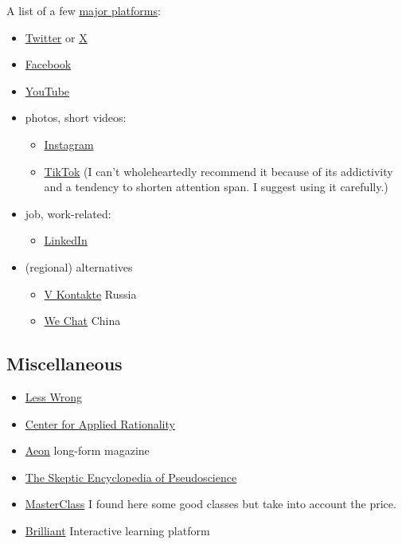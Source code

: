 \documentclass{article}
\begin{document}
A list of a few \href{https://www.visualcapitalist.com/ranked-social-networks-worldwide-by-users/}{major platforms}:
\begin{itemize}
    \item \href{https://twitter.com/?lang=en}{Twitter} or \href{https://x.com/}{X}
    \item \href{https://www.facebook.com/}{Facebook}
    \item \href{https://www.youtube.com/}{YouTube}
    \item photos, short videos:
    \begin{itemize}
        \item \href{https://www.instagram.com/?hl=en}{Instagram}
        \item \href{https://www.tiktok.com/en/}{TikTok} (I can't wholeheartedly recommend it because of its addictivity and a tendency to shorten attention span. I suggest using it carefully.)
    \end{itemize}
    \item job, work-related:
    \begin{itemize}
        \item \href{https://www.linkedin.com/}{LinkedIn}
    \end{itemize}
    \item (regional) alternatives
    \begin{itemize}
        \item \href{https://vk.com/?lang=en}{V Kontakte} Russia
        \item \href{https://www.wechat.com/}{We Chat} China
    \end{itemize}
\end{itemize}


\subsection{Miscellaneous}

\begin{itemize}
    \item \href{https://www.lesswrong.com/}{Less Wrong}
    \item \href{https://rationality.org/}{Center for Applied Rationality}
    \item \href{https://aeon.co/}{Aeon} long-form magazine
    \item \href{https://www.goodreads.com/book/show/656073.The_Skeptic_Encyclopedia_of_Pseudoscience}{The Skeptic Encyclopedia of Pseudoscience}
    \item \href{https://www.masterclass.com/}{MasterClass} I found here some good classes but take into account the price.
    \item \href{https://brilliant.org/}{Brilliant} Interactive learning platform
\end{itemize}
\end{document}
